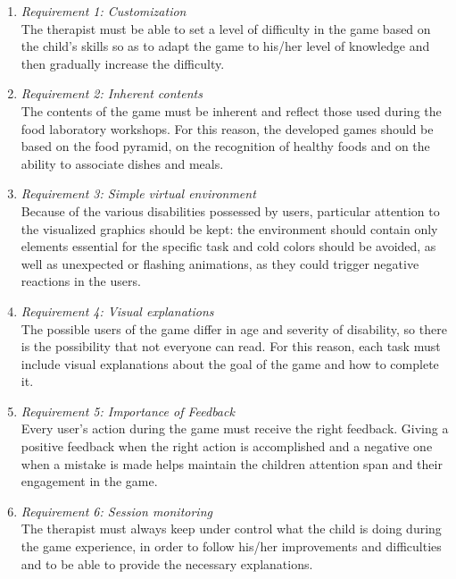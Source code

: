 \documentclass{sigchi-ext}
\begin{document}
\begin{enumerate}
\item \textit{Requirement 1: Customization}\\
      The therapist must be able to set a level of difficulty in the game based on the child’s skills so as to adapt the game to his/her level of knowledge and then gradually increase the difficulty.
\item \textit{Requirement 2: Inherent contents}\\
	  The contents of the game must be inherent and reflect those used during the food laboratory workshops. For this reason, the developed games should be based on the food pyramid, on the recognition of healthy foods and on the ability to associate dishes and meals.
	  \medskip
\item \textit{Requirement 3: Simple virtual environment}\\
	  Because of the various disabilities possessed by users, particular attention to the visualized graphics should be kept: the environment should contain only elements essential for the specific task and cold colors should be avoided, as well as unexpected or flashing animations, as they could trigger negative reactions in the users.
\item \textit{Requirement 4: Visual explanations}\\
	  The possible users of the game differ in age and severity of disability, so there is the possibility that not everyone can read. For this reason, each task must include visual explanations about the goal of the game and how to complete it.
\item \textit{Requirement 5: Importance of Feedback}\\
	  Every user’s action during the game must receive the right feedback. Giving a positive feedback when the right action is accomplished and a negative one when a mistake is made helps maintain the children attention span and their engagement in the game.
\item \textit{Requirement 6: Session monitoring}\\
		The therapist must always keep under control what the child is doing during the game experience, in order to follow his/her improvements and difficulties and to be able to provide the necessary explanations. 	  
\end{enumerate}
\end{document}
